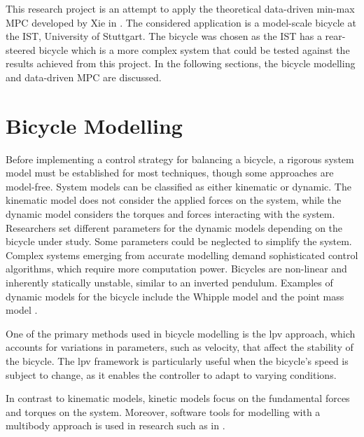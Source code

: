 This research project is an attempt to apply the theoretical data-driven min-max MPC developed by Xie in \cite{xie2024}.
The considered application is a model-scale bicycle at the \gls{IST}, University of Stuttgart.
The bicycle was chosen as the IST has a rear-steered bicycle which is a more complex system that could be tested against the results achieved from this project.
In the following sections, the bicycle modelling and data-driven MPC are discussed.

\section{Bicycle Modelling}

Before implementing a control strategy for balancing a bicycle, a rigorous system model must be established for most techniques, though some approaches are model-free. System models can be classified as either kinematic or dynamic. The kinematic model does not consider the applied forces on the system, while the dynamic model considers the torques and forces interacting with the system. Researchers set different parameters for the dynamic models depending on the bicycle under study. Some parameters could be neglected to simplify the system. Complex systems emerging from accurate modelling demand sophisticated control algorithms, which require more computation power. Bicycles are non-linear and inherently statically unstable, similar to an inverted pendulum. Examples of dynamic models for the bicycle include the Whipple model \cite{whipple1899stability} and the point mass model \cite{limebeer2006}.


One of the primary methods used in bicycle modelling is the \gls{lpv} approach, which accounts for variations in parameters, such as velocity, that affect the stability of the bicycle. The \gls{lpv} framework is particularly useful when the bicycle's speed is subject to change, as it enables the controller to adapt to varying conditions.


In contrast to kinematic models, kinetic models focus on the fundamental forces and torques on the system. Moreover, software tools for modelling with a multibody approach is used in research such as in \cite{tapken2018modelling}.


